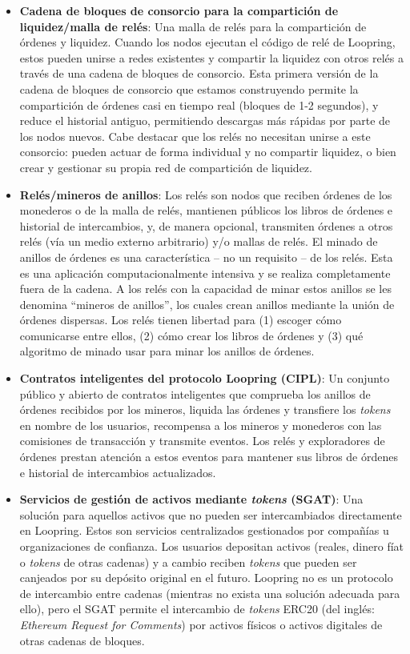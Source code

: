 \documentclass[UTF8,nofonts]{article}
\begin{document}
\begin{multicols}{2}
\begin{itemize}
\item \textbf{Cadena de bloques de consorcio para la compartición de liquidez/malla de relés}: Una malla de relés para la compartición de órdenes y liquidez. Cuando los nodos ejecutan el código de relé de Loopring, estos pueden unirse a redes existentes y compartir la liquidez con otros relés a través de una cadena de bloques de consorcio. Esta primera versión de la cadena de bloques de consorcio que estamos construyendo permite la compartición de órdenes casi en tiempo real (bloques de 1-2 segundos), y reduce el historial antiguo, permitiendo descargas más rápidas por parte de los nodos nuevos. Cabe destacar que los relés no necesitan unirse a este consorcio: pueden actuar de forma individual y  no compartir liquidez, o bien crear y gestionar su propia red de compartición de liquidez.

\item \textbf{Relés/mineros de anillos}: Los relés son nodos que reciben órdenes de los monederos o de la malla de relés, mantienen públicos los libros de órdenes e historial de intercambios, y, de manera opcional, transmiten órdenes a otros relés (vía un medio externo arbitrario) y/o mallas de relés. El minado de anillos de órdenes es una característica -- no un requisito -- de los relés. Esta es una aplicación computacionalmente intensiva y se realiza completamente fuera de la cadena. A los relés con la capacidad de minar estos anillos se les denomina \enquote{mineros de anillos}, los cuales crean anillos mediante la unión de órdenes dispersas. Los relés tienen libertad para (1) escoger cómo comunicarse entre ellos, (2) cómo crear los libros de órdenes y (3) qué algoritmo de minado usar para minar los anillos de órdenes.

\item \textbf{Contratos inteligentes del protocolo Loopring (CIPL)}: Un conjunto público y abierto de contratos inteligentes que comprueba los anillos de órdenes recibidos por los mineros, liquida las órdenes y transfiere los \textit{tokens} en nombre de los usuarios, recompensa a los mineros y monederos con las comisiones de transacción y transmite eventos. Los relés y exploradores de órdenes prestan atención a estos eventos para mantener sus libros de órdenes e historial de intercambios actualizados. 

\item \textbf{Servicios de gestión de activos mediante \textit{tokens} (SGAT)}: Una solución para aquellos activos que no pueden ser intercambiados directamente en  Loopring. Estos son servicios centralizados gestionados por compañías u organizaciones de confianza. Los usuarios depositan activos (reales, dinero fíat o \textit{tokens} de otras cadenas) y a cambio reciben \textit{tokens} que pueden ser canjeados por su depósito original en el futuro. Loopring no es un protocolo de intercambio entre cadenas (mientras no exista una solución adecuada para ello), pero el SGAT permite el intercambio de \textit{tokens} ERC20 (del inglés: \textit{Ethereum Request for Comments}) \cite{ERC20} por activos físicos o activos digitales de otras cadenas de bloques. 



\end{itemize}
\end{multicols}
\end{document}
